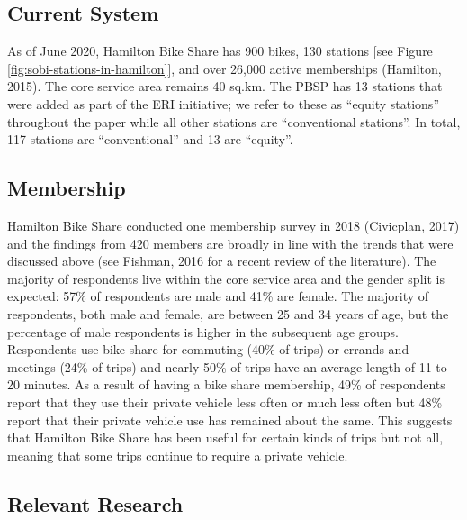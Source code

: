 \documentclass[]{elsarticle} %
\begin{document}
\hypertarget{current-system}{%
\subsection{Current System}\label{current-system}}

As of June 2020, Hamilton Bike Share has 900 bikes, 130 stations {[}see
Figure \ref{fig:sobi-stations-in-hamilton}{]}, and over 26,000 active
memberships (Hamilton, 2015). The core service area remains 40 sq.km.
The PBSP has 13 stations that were added as part of the ERI initiative;
we refer to these as ``equity stations'' throughout the paper while all
other stations are ``conventional stations''. In total, 117 stations are
``conventional'' and 13 are ``equity''.

\hypertarget{membership}{%
\subsection{Membership}\label{membership}}

Hamilton Bike Share conducted one membership survey in 2018 (Civicplan,
2017) and the findings from 420 members are broadly in line with the
trends that were discussed above (see Fishman, 2016 for a recent review
of the literature). The majority of respondents live within the core
service area and the gender split is expected: 57\% of respondents are
male and 41\% are female. The majority of respondents, both male and
female, are between 25 and 34 years of age, but the percentage of male
respondents is higher in the subsequent age groups. Respondents use bike
share for commuting (40\% of trips) or errands and meetings (24\% of
trips) and nearly 50\% of trips have an average length of 11 to 20
minutes. As a result of having a bike share membership, 49\% of
respondents report that they use their private vehicle less often or
much less often but 48\% report that their private vehicle use has
remained about the same. This suggests that Hamilton Bike Share has been
useful for certain kinds of trips but not all, meaning that some trips
continue to require a private vehicle.

\hypertarget{relevant-research}{%
\subsection{Relevant Research}\label{relevant-research}}
\end{document}
